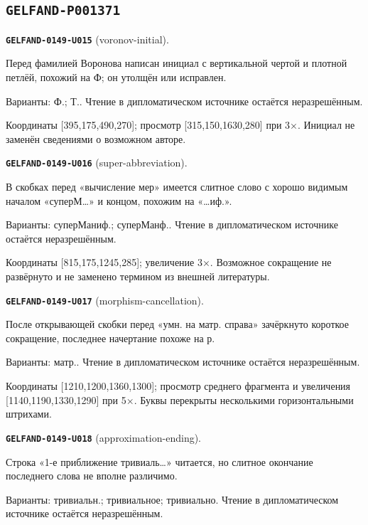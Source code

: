 \documentclass[11pt]{article}
\theoremstyle{definition}
\theoremstyle{remark}
\begin{document}
\subsection*{\texttt{GELFAND-P001371}}
\noindent\leavevmode{}\label{GELFAND-P001371:voronov-initial:note}\textbf{\texttt{GELFAND-0149-U015}} (voronov-initial).\par\nopagebreak[4]
Перед фамилией Воронова написан инициал с вертикальной чертой и плотной петлёй, похожий на Ф; он утолщён или исправлен.\par
Варианты: Ф.; Т.. Чтение в дипломатическом источнике остаётся неразрешённым.\par
Координаты [395,175,490,270]; просмотр [315,150,1630,280] при 3×. Инициал не заменён сведениями о возможном авторе.\par\medskip
\noindent\leavevmode{}\label{GELFAND-P001371:super-abbreviation:note}\textbf{\texttt{GELFAND-0149-U016}} (super-abbreviation).\par\nopagebreak[4]
В скобках перед «вычисление мер» имеется слитное слово с хорошо видимым началом «суперМ…» и концом, похожим на «…иф.».\par
Варианты: суперМаниф.; суперМанф.. Чтение в дипломатическом источнике остаётся неразрешённым.\par
Координаты [815,175,1245,285]; увеличение 3×. Возможное сокращение не развёрнуто и не заменено термином из внешней литературы.\par\medskip
\noindent\leavevmode{}\label{GELFAND-P001371:morphism-cancellation:note}\textbf{\texttt{GELFAND-0149-U017}} (morphism-cancellation).\par\nopagebreak[4]
После открывающей скобки перед «умн. на матр. справа» зачёркнуто короткое сокращение, последнее начертание похоже на р.\par
Варианты: матр.. Чтение в дипломатическом источнике остаётся неразрешённым.\par
Координаты [1210,1200,1360,1300]; просмотр среднего фрагмента и увеличения [1140,1190,1330,1290] при 5×. Буквы перекрыты несколькими горизонтальными штрихами.\par\medskip
\noindent\leavevmode{}\label{GELFAND-P001371:approximation-ending:note}\textbf{\texttt{GELFAND-0149-U018}} (approximation-ending).\par\nopagebreak[4]
Строка «1-е приближение тривиаль…» читается, но слитное окончание последнего слова не вполне различимо.\par
Варианты: тривиальн.; тривиальное; тривиально. Чтение в дипломатическом источнике остаётся неразрешённым.\par
\end{document}
